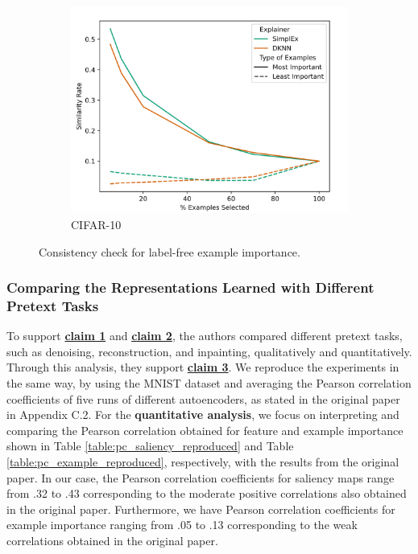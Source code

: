 \begin{figure}
\begin{subfigure}[b]{0.3\textwidth}
         \centering
         \includegraphics[width=\textwidth]{images/example_consistency_cifar10.png}
         \caption{CIFAR-10}
         \label{fig:cifar}
     \end{subfigure}
        \caption{Consistency check for label-free example importance.}
        \label{fig:example-importance}
\end{figure}

\subsubsection{Comparing the Representations Learned with Different Pretext Tasks}

To support \textbf{\hyperref[claim1]{claim 1}} and \textbf{\hyperref[claim2]{claim 2}}, the authors compared different pretext tasks, such as denoising, reconstruction, and inpainting, qualitatively and quantitatively. Through this analysis, they support \textbf{\hyperref[claim3]{claim 3}}. We reproduce the experiments in the same way, by using the MNIST dataset and averaging the Pearson correlation coefficients of five runs of different autoencoders, as stated in the original paper in Appendix C.2. For the \textbf{quantitative analysis}, we focus on interpreting and comparing the Pearson correlation obtained for feature and example importance shown in Table \ref{table:pc_saliency_reproduced} and Table \ref{table:pc_example_reproduced}, respectively, with the results from the original paper. In our case, the Pearson correlation coefficients for saliency maps range from .32 to .43 corresponding to the moderate positive correlations also obtained in the original paper. Furthermore, we have Pearson correlation coefficients for example importance ranging from .05 to .13 corresponding to the weak correlations obtained in the original paper.



